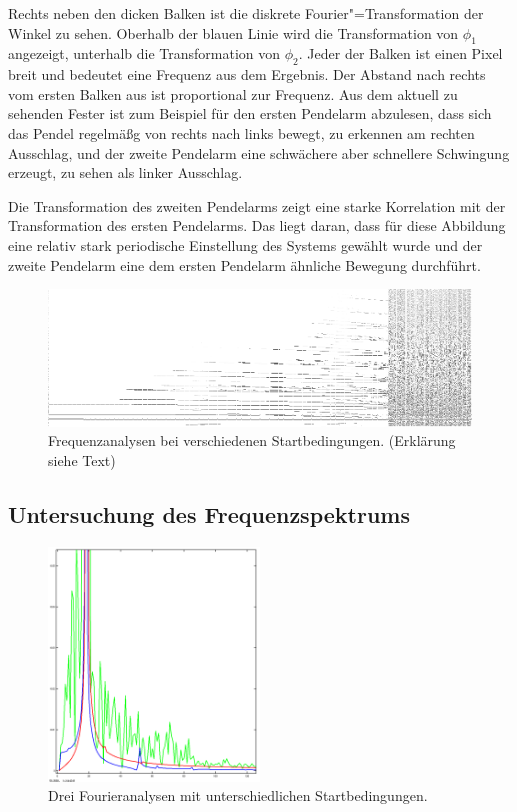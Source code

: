 Rechts neben den dicken Balken ist die diskrete Fourier"=Transformation der Winkel zu sehen.
Oberhalb der blauen Linie wird die Transformation von $\phi_1$ angezeigt, unterhalb die Transformation von $\phi_2$.
Jeder der Balken ist einen Pixel breit und bedeutet eine Frequenz aus dem Ergebnis.
Der Abstand nach rechts vom ersten Balken aus ist proportional zur Frequenz.
Aus dem aktuell zu sehenden Fester ist zum Beispiel für den ersten Pendelarm abzulesen, dass sich das Pendel regelmäßg von rechts nach links bewegt, zu erkennen am rechten Ausschlag, und der zweite Pendelarm eine schwächere aber schnellere Schwingung erzeugt, zu sehen als linker Ausschlag.

Die Transformation des zweiten Pendelarms zeigt eine starke Korrelation mit der Transformation des ersten Pendelarms. Das liegt daran, dass für diese Abbildung eine relativ stark periodische Einstellung des Systems gewählt wurde und der zweite Pendelarm eine dem ersten Pendelarm ähnliche Bewegung durchführt.

\begin{figure}
  \includegraphics[width=\textwidth]{images/fourier_20s_cropped.png}
  \caption{Frequenzanalysen bei verschiedenen Startbedingungen. (Erklärung siehe Text)}
  \label{fig:frequencies}
\end{figure}

\subsection{Untersuchung des Frequenzspektrums}

\begin{figure}
  \includegraphics[width=0.5\textwidth]{images/fourier_100_400_900.png}
  \caption{Drei Fourieranalysen mit unterschiedlichen Startbedingungen.}
  \label{fig:fourieranalysen}
\end{figure}

